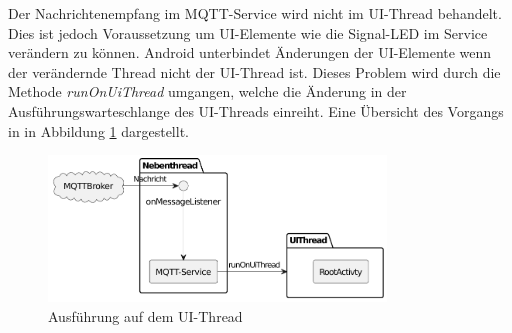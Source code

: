 \documentclass[11pt,a4paper]{report}
\begin{document}
Der Nachrichtenempfang im MQTT-Service wird nicht im UI-Thread behandelt.
Dies ist jedoch Voraussetzung um UI-Elemente wie die Signal-LED im Service verändern zu können.
Android unterbindet Änderungen der UI-Elemente wenn der verändernde Thread nicht der UI-Thread ist.
Dieses Problem wird durch die Methode \textit{runOnUiThread} umgangen, welche die Änderung in der Ausführungswarteschlange des UI-Threads einreiht.
Eine Übersicht des Vorgangs in in Abbildung \ref{fig:runOnUiThread} dargestellt.
\begin{figure}[htbp]
  \centering
  \includegraphics[width=0.8\textwidth]{images/runOnUiThread.pdf}
  \caption{Ausführung auf dem UI-Thread}
  \label{fig:runOnUiThread}
\end{figure}
\end{document}
